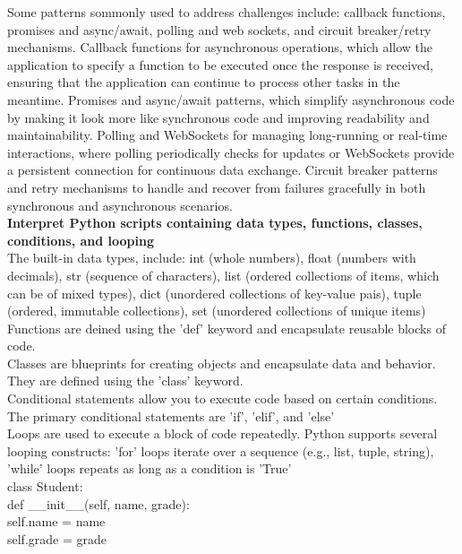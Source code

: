 \documentclass{article}
\begin{document}
	Some patterns sommonly used to address challenges include: callback functions, promises and async/await, polling and web sockets, and circuit breaker/retry mechanisms. Callback functions for asynchronous operations, which allow the application to specify a function to be executed once the response is received, ensuring that the application can continue to process other tasks in the meantime. Promises and async/await patterns, which simplify asynchronous code by making it look more like synchronous code and improving readability and maintainability. Polling and WebSockets for managing long-running or real-time interactions, where polling periodically checks for updates or WebSockets provide a persistent connection for continuous data exchange. Circuit breaker patterns and retry mechanisms to handle and recover from failures gracefully in both synchronous and asynchronous scenarios.\\

\textbf{Interpret Python scripts containing data types, functions, classes, conditions, and looping}\\

The built-in data types, include: int (whole numbers), float (numbers with decimals), str (sequence of characters), list (ordered collections of items, which can be of mixed types), dict (unordered collections of key-value pais), tuple (ordered, immutable collections), set (unordered collections of unique items)\\

Functions are deined using the 'def' keyword and encapsulate reusable blocks of code.\\

Classes are blueprints for creating objects and encapsulate data and behavior. They are defined using the 'class' keyword.\\

Conditional statements allow you to execute code based on certain conditions. The primary conditional statements are 'if', 'elif', and 'else'\\

Loops are used to execute a block of code repeatedly. Python supports several looping constructs: 'for' loops iterate over a sequence (e.g., list, tuple, string), 'while' loops repeats as long as a condition is 'True'\\

\noindent class Student:\\
	\indent def \_\_init\_\_(self, name, grade):\\
		\indent\indent self.name = name\\
		\indent\indent self.grade = grade\\
\end{document}
